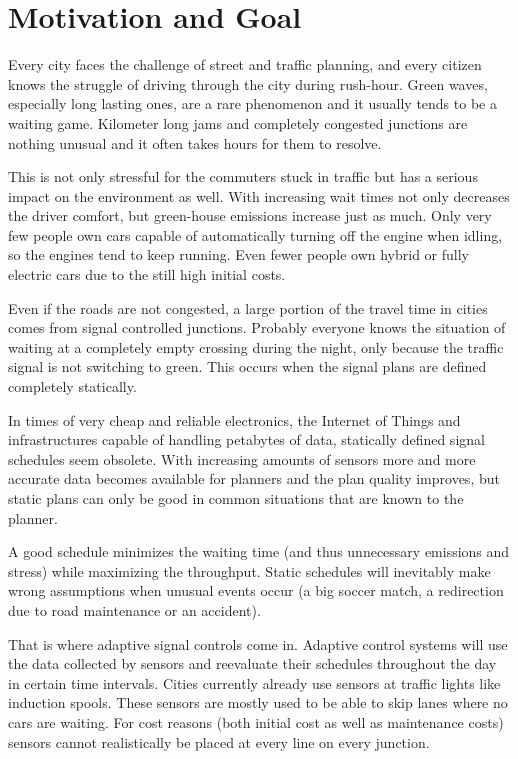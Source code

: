 \section{Motivation and Goal}

Every city faces the challenge of street and traffic planning, and every citizen knows the struggle of driving through the city during rush-hour. Green waves, especially long lasting ones, are a rare phenomenon and it usually tends to be a waiting game. Kilometer long jams and completely congested junctions are nothing unusual and it often takes hours for them to resolve.

This is not only stressful for the commuters stuck in traffic but has a serious impact on the environment as well.
With increasing wait times not only decreases the driver comfort, but green-house emissions increase just as much. Only very few people own cars capable of automatically turning off the engine when idling, so the engines tend to keep running. Even fewer people own hybrid or fully electric cars due to the still high initial costs.

Even if the roads are not congested, a large portion of the travel time in cities comes from signal controlled junctions. Probably everyone knows the situation of waiting at a completely empty crossing during the night, only because the traffic signal is not switching to green.
This occurs when the signal plans are defined completely statically.

In times of very cheap and reliable electronics, the Internet of Things and infrastructures capable of handling petabytes of data, statically defined signal schedules seem obsolete.
With increasing amounts of sensors more and more accurate data becomes available for planners and the plan quality improves, but static plans can only be good in common situations that are known to the planner.

A good schedule minimizes the waiting time (and thus unnecessary emissions and stress) while maximizing the throughput. Static schedules will inevitably make wrong assumptions when unusual events occur (a big soccer match, a redirection due to road maintenance or an accident).

That is where adaptive signal controls come in. Adaptive control systems will use the data collected by sensors and reevaluate their schedules throughout the day in certain time intervals.
Cities currently already use sensors at traffic lights like induction spools.
These sensors are mostly used to be able to skip lanes where no cars are waiting. For cost reasons (both initial cost as well as maintenance costs) sensors cannot realistically be placed at every line on every junction.

